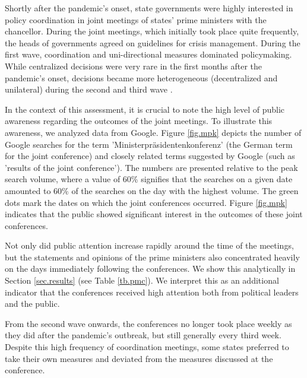 \documentclass[12pt, abstracton]{scrartcl}
\begin{document}
Shortly after the pandemic's onset, state governments were highly interested in policy coordination in joint meetings of states' prime ministers with the chancellor. During the joint meetings, which initially took place quite frequently, the heads of governments agreed on guidelines for crisis management. During the first wave, coordination and uni-directional measures dominated policymaking. While centralized decisions were very rare in the first months after the pandemic's onset, decisions became more heterogeneous (decentralized and unilateral) during the second and third wave \citep{Hegele2021, Kuhlmann2021}.

In the context of this assessment, it is crucial to note the high level of public awareness regarding the outcomes of the joint meetings. To illustrate this awareness, we analyzed data from Google. Figure \ref{fig.mpk} depicts the number of Google searches for the term 'Ministerpräsidentenkonferenz' (the German term for the joint conference) and closely related terms suggested by Google (such as 'results of the joint conference'). The numbers are presented relative to the peak search volume, where a value of 60\% signifies that the searches on a given date amounted to 60\% of the searches on the day with the highest volume. The green dots mark the dates on which the joint conferences occurred. Figure \ref{fig.mpk} indicates that the public showed significant interest in the outcomes of these joint conferences.

Not only did public attention increase rapidly around the time of the meetings, but the statements and opinions of the prime ministers also concentrated heavily on the days immediately following the conferences. We show this analytically in Section \ref{sec.results} (see Table \ref{tb.pmc}). We interpret this as an additional indicator that the conferences received high attention both from political leaders and the public.

From the second wave onwards, the conferences no longer took place weekly as they did after the pandemic's outbreak, but still generally every third week. Despite this high frequency of coordination meetings, some states preferred to take their own measures and deviated from the measures discussed at the conference.

\end{document}
